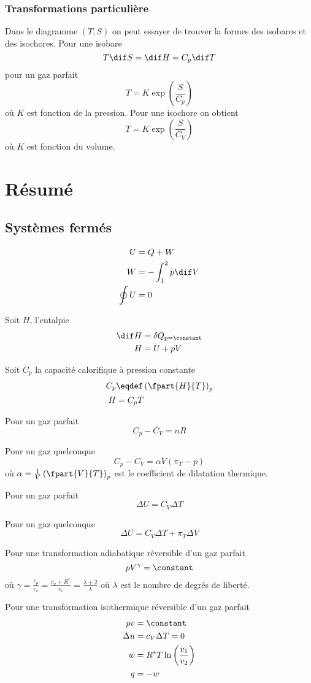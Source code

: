 \subsubsection{Transformations particulière}
Dans le diagramme $(T,S)$ on peut essayer de trouver
la formes des isobares et des isochores.
Pour une isobare
\[ T\dif S = \dif H = C_p\dif T \]
pour un gaz parfait
\[ T = K \exp \left(\frac S{C_p}\right) \]
où $K$ est fonction de la pression.
Pour une isochore on obtient
\[ T = K \exp \left(\frac S{C_V}\right) \]
où $K$ est fonction du volume.

\section{Résumé}
\subsection{Systèmes fermés}
\begin{align*}
  U & = Q + W\\
  W & = -\int_1^2 p \dif V\\
  \oint U & = 0
\end{align*}

Soit $H$, l'entalpie
\begin{align*}
  \dif H & = \delta Q_{p = \constant}\\
  H & = U + pV
\end{align*}

Soit $C_p$ la capacité calorifique à pression constante
\begin{align*}
  C_p & \eqdef \left(\fpart{H}{T}\right)_p\\
  H & = C_p T %
\end{align*}

Pour un gaz parfait
\[ C_p - C_V = nR \]

Pour un gaz quelconque
\[ C_p - C_V = \alpha V (\pi_T - p) \]
où $\alpha = \frac{1}{V} \left(\fpart{V}{T}\right)_p$
est le coefficient de dilatation thermique.

Pour un gaz parfait
\[ \Delta U = C_V \Delta T \]

Pour un gaz quelconque
\[ \Delta U = C_V \Delta T + \pi_T \Delta V \]


Pour une transformation adiabatique réversible d'un gaz parfait
\[ pV^\gamma = \constant \]
où $\gamma = \frac{c_p}{c_v} = \frac{c_v+R^*}{c_v} = \frac{\lambda+2}{\lambda}$
où $\lambda$ est le nombre de degrés de liberté.

Pour une transformation isothermique réversible d'un gaz parfait
\begin{align*}
  pv & = \constant\\
  \Delta u & = c_V \Delta T = 0\\
  w & = R^* T \ln\left(\frac{v_1}{v_2}\right)\\
  q & = -w
\end{align*}

